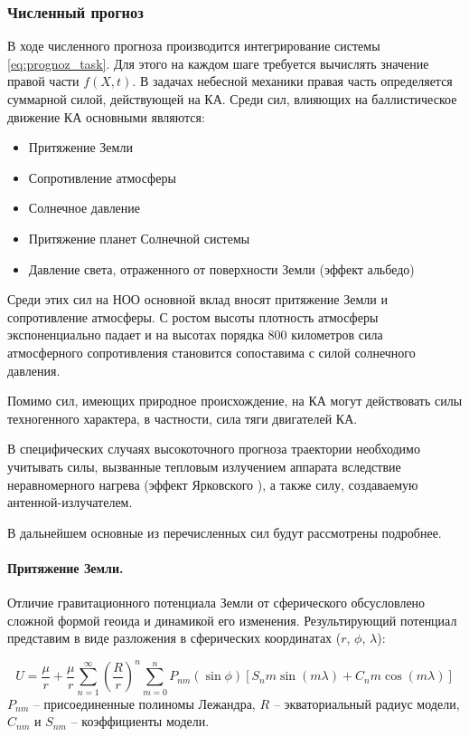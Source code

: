 \subsubsection{Численный прогноз}

В ходе численного прогноза производится интегрирование системы \eqref{eq:prognoz_task}.
Для этого на каждом шаге требуется вычислять значение правой части $f(X, t)$. 
В задачах небесной механики правая часть определяется суммарной силой, действующей на КА.
Среди сил, влияющих на баллистическое движение КА основными являются:
\begin{itemize}
    \item Притяжение Земли
    \item Сопротивление атмосферы
    \item Солнечное давление
    \item Притяжение планет Солнечной системы
    \item Давление света, отраженного от поверхности Земли (эффект альбедо)
\end{itemize}

Среди этих сил на НОО основной вклад вносят притяжение Земли и сопротивление атмосферы.
С ростом высоты плотность атмосферы экспоненциально падает и на высотах порядка 800 километров
сила атмосферного сопротивления становится сопоставима с силой солнечного давления.

Помимо сил, имеющих природное происхождение, на КА могут действовать силы техногенного характера, 
в частности, сила тяги двигателей КА.

В специфических случаях высокоточного прогноза траектории необходимо учитывать
силы, вызванные тепловым излучением аппарата вследствие неравномерного нагрева (эффект Ярковского \cite{farinella1996}), 
а также силу, создаваемую антенной-излучателем.

В дальнейшем основные из перечисленных сил будут рассмотрены подробнее.

\paragraph{Притяжение Земли.}

Отличие гравитационного потенциала Земли от сферического обсусловлено 
сложной формой геоида и динамикой его изменения. Результирующий потенциал представим в виде разложения
в сферических координатах ($r$, $\phi$, $\lambda$):

\begin{equation*}
    U = \frac{\mu}{r} + 
    \frac{\mu}{r} \sum_{n=1}^{\infty} \left(\frac{R}{r}\right)^n 
    \sum_{m=0}^{n} P_{nm}(\sin\phi) \left[ S_nm \sin(m \lambda) + C_nm \cos(m \lambda) \right]
\end{equation*}
$P_{nm}$ -- присоединенные полиномы Лежандра, $R$ -- экваториальный радиус модели, 
$C_{nm}$ и $S_{nm}$ -- коэффициенты модели.

